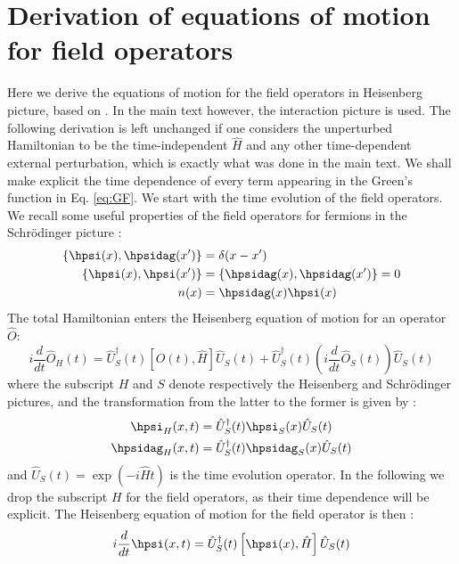 \section{Derivation of equations of motion for field operators}
\label{app:EOM}
Here we derive the equations of motion for the field operators in Heisenberg picture, based on \cite{martin2016interacting, stefanucci2013nonequilibrium, strinati1988application, aryasetiawan1998gw}. In the main text however, the interaction picture is used. The following derivation is left unchanged if one considers the unperturbed Hamiltonian to be the time-independent $\hat{H}$ and any other time-dependent external perturbation, which is exactly what was done in the main text.
We shall make explicit the time dependence of every term appearing in the Green's function in Eq. \eqref{eq:GF}. We start with the time evolution of the field operators. We recall some useful properties of the field operators for fermions in the Schrödinger picture :
\begin{align}
\begin{split}
	\{ \hpsi(x),\hpsidag(x')\} &= \delta (x-x') \\
	\{ \hpsi(x),\hpsi(x') \} &= \{ \hpsidag(x),\hpsidag(x') \} = 0 \\
	n(x) &= \hpsidag(x)\hpsi(x)
\end{split}	
\end{align}
 The total Hamiltonian enters the Heisenberg equation of motion for an operator $\hat{O}$:
\begin{equation}
	i\frac{d}{d t}\hat{O}_H(t) = \hat{U}^\dagger_S(t) \left[ \hat{O}(t),\hat{H} \right] \hat{U}_S(t) + \hat{U}^\dagger_S(t) (i \frac{d}{dt} \hat{O}_S(t)) \hat{U}_S(t)
\end{equation}
where the subscript $H$ and $S$ denote respectively the Heisenberg and Schrödinger pictures, and the transformation from the latter to the former is given by :
\begin{align}
\begin{split}
	\hpsi_H(x,t) &= \hat{U}^\dagger_S(t) \hpsi_S(x) \hat{U}_S(t) \\
	\hpsidag_H(x,t) &= \hat{U}^\dagger_S(t) \hpsidag_S(x) \hat{U}_S(t)
\end{split}
\end{align}
and $\hat{U}_S(t) = \exp(-i\hat{H}t) $ is the time evolution operator. In the following we drop the subscript $H$ for the field operators, as their time dependence will be explicit. The Heisenberg equation of motion for the field operator is then :
\begin{equation}
	i\frac{d}{dt} \hpsi(x,t) = \hat{U}^\dagger_S(t) \left[ \hpsi(x),\hat{H} \right] \hat{U}_S(t)
\end{equation}
